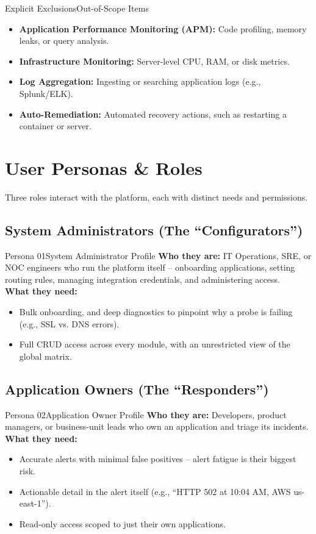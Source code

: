\documentclass[11pt,a4paper]{article}
\begin{document}
\begin{issuebox}{Explicit Exclusions}{Out-of-Scope Items}
\begin{itemize}
  \item \textbf{Application Performance Monitoring (APM):} Code profiling, memory leaks, or query analysis.
  \item \textbf{Infrastructure Monitoring:} Server-level CPU, RAM, or disk metrics.
  \item \textbf{Log Aggregation:} Ingesting or searching application logs (e.g., Splunk/ELK).
  \item \textbf{Auto-Remediation:} Automated recovery actions, such as restarting a container or server.
\end{itemize}
\end{issuebox}

\section{User Personas \& Roles}
Three roles interact with the platform, each with distinct needs and permissions.

\subsection{System Administrators (The ``Configurators'')}
\begin{recbox}{Persona 01}{System Administrator Profile}
\textbf{Who they are:} IT Operations, SRE, or NOC engineers who run the platform itself -- onboarding applications, setting routing rules, managing integration credentials, and administering access.\\[8pt]
\textbf{What they need:}
\begin{itemize}
  \item Bulk onboarding, and deep diagnostics to pinpoint why a probe is failing (e.g., SSL vs. DNS errors).
  \item Full CRUD access across every module, with an unrestricted view of the global matrix.
\end{itemize}
\end{recbox}

\subsection{Application Owners (The ``Responders'')}
\begin{recbox}{Persona 02}{Application Owner Profile}
\textbf{Who they are:} Developers, product managers, or business-unit leads who own an application and triage its incidents.\\[8pt]
\textbf{What they need:}
\begin{itemize}
  \item Accurate alerts with minimal false positives -- alert fatigue is their biggest risk.
  \item Actionable detail in the alert itself (e.g., ``HTTP 502 at 10:04 AM, AWS us-east-1'').
  \item Read-only access scoped to just their own applications.
\end{itemize}
\end{recbox}
\end{document}
